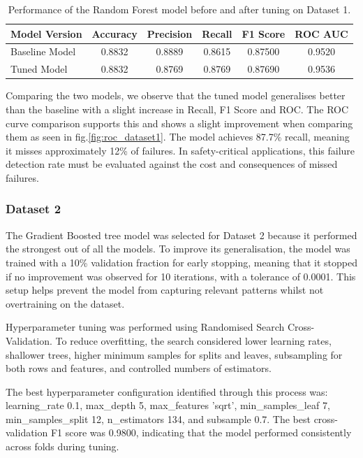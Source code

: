 \documentclass[11pt]{article}
\begin{document}
\begin{table}[h!]
\centering
\begin{tabular}{l c c c c c}
\hline
\textbf{Model Version} & \textbf{Accuracy} & \textbf{Precision} & \textbf{Recall} & \textbf{F1 Score} & \textbf{ROC AUC} \\ 
\hline
Baseline Model & 0.8832 & 0.8889 & 0.8615 & 0.87500 & 0.9520 \\
Tuned Model    & 0.8832 & 0.8769 & 0.8769 & 0.87690 & 0.9536 \\
\hline
\end{tabular}
\caption{Performance of the Random Forest model before and after tuning on Dataset 1.}
\label{tab:rf_tuning_dataset1}
\end{table}

Comparing the two models, we observe that the tuned model generalises better than the baseline with a slight increase in Recall, F1 Score and ROC. The ROC curve comparison supports this and shows a slight improvement when comparing them as seen in fig.\ref{fig:roc_dataset1}. The model achieves 87.7\% recall, meaning it misses approximately 12\% of failures. In safety-critical applications, this failure detection rate must be evaluated against the cost and consequences of missed failures.

\subsubsection{Dataset 2}

The Gradient Boosted tree model was selected for Dataset 2 because it performed the strongest out of all the models. To improve its generalisation, the model was trained with a 10\% validation fraction for early stopping, meaning that it stopped if no improvement was observed for 10 iterations, with a tolerance of 0.0001. This setup helps prevent the model from capturing relevant patterns whilst not overtraining on the dataset.

Hyperparameter tuning was performed using Randomised Search Cross-Validation. To reduce overfitting, the search considered lower learning rates, shallower trees, higher minimum samples for splits and leaves, subsampling for both rows and features, and controlled numbers of estimators.

The best hyperparameter configuration identified through this process was: learning\_rate 0.1, max\_depth 5, max\_features 'sqrt', min\_samples\_leaf 7, min\_samples\_split 12, n\_estimators 134, and subsample 0.7. The best cross-validation F1 score was 0.9800, indicating that the model performed consistently across folds during tuning.
\end{document}
